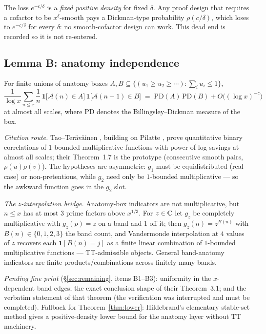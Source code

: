 \begin{remark}
The loss $e^{-c/\delta}$ is a \emph{fixed positive density} for fixed
$\delta$. Any proof design that requires a cofactor to be
$x^{\delta}$-smooth pays a Dickman-type probability
$\rho(c/\delta)$, which loses to $e^{-c/\delta}$ for every $\delta$: no
smooth-cofactor design can work. This dead end is recorded so it is not
re-entered.
\end{remark}

\subsection{Lemma B: anatomy independence}

\begin{lemma}[B]\label{lem:B}
\statusC\quad
For finite unions of anatomy boxes
$A,B\subseteq\{(u_1\ge u_2\ge\cdots):\sum_iu_i\le1\}$,
\[
\frac{1}{\log x}\sum_{n\le x}\frac{1}{n}\,
\mathbf 1\big[\mathcal A(n)\in A\big]\,
\mathbf 1\big[\mathcal A(n-1)\in B\big]
\;=\;\mathrm{PD}(A)\,\mathrm{PD}(B)+O\big((\log x)^{-c}\big)
\]
at almost all scales, where $\mathrm{PD}$ denotes the
Billingsley--Dickman measure of the box.
\end{lemma}

\noindent\emph{Citation route.} Tao--Ter\"av\"ainen
\cite{TT25}, building on Pilatte \cite{Pil23}, prove quantitative binary
correlations of $1$-bounded multiplicative functions with power-of-log
savings at almost all scales; their Theorem~1.7 is the prototype
(consecutive smooth pairs, $\rho(u)\rho(v)$). The hypotheses are
asymmetric: $g_1$ must be equidistributed (real case) or non-pretentious,
while $g_2$ need only be $1$-bounded multiplicative --- so the awkward
function goes in the $g_2$ slot.

\noindent\emph{The $z$-interpolation bridge.} Anatomy-box indicators are
not multiplicative, but $n\le x$ has at most $3$ prime factors above
$x^{1/3}$. For $z\in\mathbb{C}$ let $g_z$ be completely multiplicative with
$g_z(p)=z$ on a band and $1$ off it; then $g_z(n)=z^{B(n)}$ with
$B(n)\in\{0,1,2,3\}$ the band count, and Vandermonde interpolation at $4$
values of $z$ recovers each $\mathbf 1[B(n)=j]$ as a finite linear
combination of $1$-bounded multiplicative functions --- TT-admissible
objects. General band-anatomy indicators are finite
products/combinations across finitely many bands.

\noindent\emph{Pending fine print} (\S\ref{sec:remaining}, items B1--B3):
uniformity in the $x$-dependent band edges; the exact conclusion shape of
their Theorem~3.1; and the verbatim statement of that theorem (the
verification was interrupted and must be completed). Fallback for
Theorem~\ref{thm:lower}: Hildebrand's elementary stable-set method
\cite{Hil85} gives a positive-density lower bound for the anatomy layer
without TT machinery.

